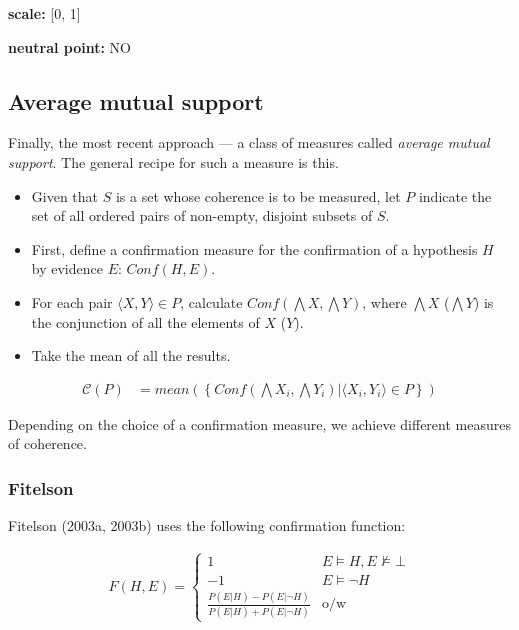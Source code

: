 \documentclass[10pt,]{scrartcl}
\begin{document}
\noindent \textbf{scale:} {[}0, 1{]}

\noindent \textbf{neutral point:} NO

\subsection{Average mutual support}

Finally, the most recent approach --- a class of measures called
\textit{average mutual support}. The general recipe for such a measure
is this.

\begin{itemize}
\item
  Given that \(S\) is a set whose coherence is to be measured, let \(P\)
  indicate the set of all ordered pairs of non-empty, disjoint subsets
  of \(S\).
\item
  First, define a confirmation measure for the confirmation of a hypothesis \(H\) by evidence  \(E\): \(Conf(H,E)\).
\item
  For each pair \(\langle X, Y \rangle \in P\), calculate
  \(Conf(\bigwedge X, \bigwedge Y)\), where $\bigwedge X$ ($\bigwedge Y$) is the conjunction of all the elements of $X$ ($Y$).
\item
  Take the mean of all the results.
\end{itemize}\begin{align*}
    \mathcal{C}(P) & =
mean\left(\left\{Conf(\bigwedge X_i, \bigwedge Y_i) | \langle X_i, Y_i \rangle \in P\right\} \right)
\end{align*}

\noindent Depending on the choice of a confirmation measure, we achieve
different measures of coherence.

\subsubsection{Fitelson}

Fitelson (2003a, 2003b) uses the following confirmation function:

\begin{align*}
    F(H,E) = \begin{cases}
    1 & E\models H, E\not \models \bot \\
    -1 & E \models \neg H\\
    \frac{P(E|H)-P(E|\neg H)}{P(E|H)+P(E|\neg H)} & \mbox{o/w}
    \end{cases}
\end{align*}
\end{document}
